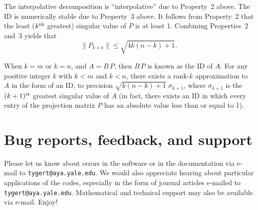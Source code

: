 \documentclass[letterpaper,12pt]{article}
\def\st{{\hbox{\scriptsize{\rm st}}}}
\def\th{{\hbox{\scriptsize{\rm th}}}}
\begin{document}
The interpolative decomposition is ``interpolative''
due to Property~2 above. The ID is numerically stable
due to Property~3 above.
It follows from Property~2 that the least ($k^\th$ greatest) singular value
of $P$ is at least 1. Combining Properties~2 and~3 yields that
%
\begin{equation}
\| P_{k \times n} \| \le \sqrt{4k(n-k)+1}.
\end{equation}

When $k = m$ or $k = n$, and $A = B \, P$,
then $B \, P$ is known as the ID of $A$.
For any positive integer $k$ with $k < m$ and $k < n$,
there exists a rank-$k$ approximation to $A$ in the form of an ID,
to precision $\sqrt{k(n-k)+1} \; \sigma_{k+1}$,
where $\sigma_{k+1}$ is the $(k+1)^\st$ greatest singular value of $A$
(in fact, there exists an ID in which every entry
of the projection matrix $P$ has an absolute value less than or equal
to 1).



\section{Bug reports, feedback, and support}

Please let us know about errors in the software or in the documentation
via e-mail to {\tt tygert@aya.yale.edu}.
We would also appreciate hearing about particular applications of the codes,
especially in the form of journal articles
e-mailed to {\tt tygert@aya.yale.edu}.
Mathematical and technical support may also be available via e-mail. Enjoy!





\end{document}
